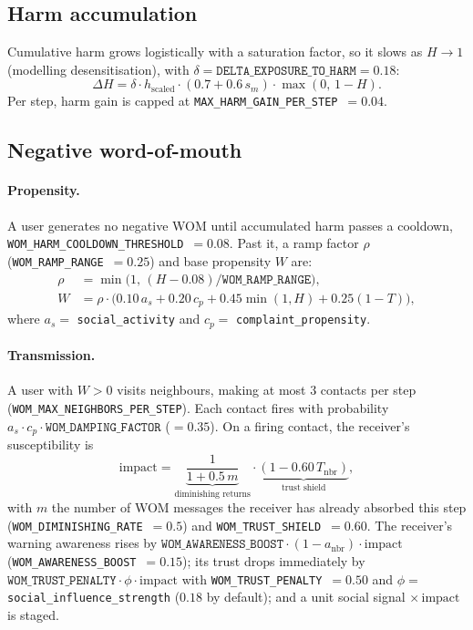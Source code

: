 \documentclass[11pt]{article}
\newcommand{\code}[1]{\texttt{#1}}
\begin{document}
\subsection{Harm accumulation}
\label{sub:harmgain}

Cumulative harm grows logistically with a saturation factor, so it slows as
$H\to1$ (modelling desensitisation),
with $\delta = \code{DELTA\_EXPOSURE\_TO\_HARM} = 0.18$:
\[
\Delta H = \delta \cdot h_{\text{scaled}} \cdot (0.7 + 0.6\,s_m)
\cdot \max(0,\,1 - H).
\]
Per step, harm gain is capped at \code{MAX\_HARM\_GAIN\_PER\_STEP}~$=0.04$.

\subsection{Negative word-of-mouth}
\label{sub:wom}

\paragraph{Propensity.}
A user generates no negative WOM until accumulated harm passes a cooldown,
\code{WOM\_HARM\_COOLDOWN\_THRESHOLD}~$=0.08$. Past it, a ramp factor $\rho$
(\code{WOM\_RAMP\_RANGE}~$=0.25$) and base propensity $W$ are:
\begin{align*}
\rho &= \min\!\big(1,\,(H - 0.08)/\code{WOM\_RAMP\_RANGE}\big), \\
W &= \rho \cdot \Big(0.10\,a_s + 0.20\,c_p + 0.45\min(1,H) + 0.25(1 - T)\Big),
\end{align*}
where $a_s = $ \code{social\_activity} and $c_p = $ \code{complaint\_propensity}.

\paragraph{Transmission.}
A user with $W>0$ visits neighbours, making at most $3$ contacts per step
(\code{WOM\_MAX\_NEIGHBORS\_PER\_STEP}).
Each contact fires with probability
$a_s \cdot c_p \cdot \code{WOM\_DAMPING\_FACTOR}$ ($=0.35$). On a firing contact, the receiver's
susceptibility is
\[
\text{impact} = \underbrace{\frac{1}{1 + 0.5\, m}}_{\text{diminishing returns}}
\cdot \underbrace{(1 - 0.60\, T_{\text{nbr}})}_{\text{trust shield}},
\]
with $m$ the number of WOM messages the receiver has already absorbed this step
(\code{WOM\_DIMINISHING\_RATE}~$=0.5$) and \code{WOM\_TRUST\_SHIELD}~$=0.60$. The
receiver's warning awareness rises by
$\code{WOM\_AWARENESS\_BOOST}\cdot(1-a_{\text{nbr}})\cdot\text{impact}$
(\code{WOM\_AWARENESS\_BOOST}~$=0.15$); its trust drops immediately by
$\code{WOM\_TRUST\_PENALTY}\cdot \phi \cdot \text{impact}$ with
\code{WOM\_TRUST\_PENALTY}~$=0.50$ and $\phi=$ \code{social\_influence\_strength}
($0.18$ by default); and a unit social signal $\times\,\text{impact}$ is staged.
\end{document}
